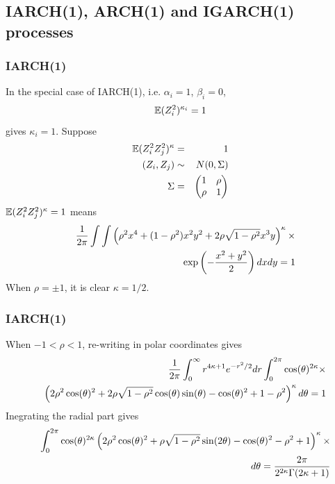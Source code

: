 \documentclass{beamer}
\begin{document}
\subsection{IARCH(1), ARCH(1) and IGARCH(1) processes}
\begin{frame}
  \frametitle{IARCH(1)}
  In the special case of IARCH(1), i.e. $\alpha_{i} = 1$, $\beta_{i} = 0$,
  \[
  \mathbb{E} (Z_i^2)^{\kappa_i} = 1
  \]
  gives $\kappa_i = 1$. Suppose
  \begin{eqnarray*}
    \mathbb{E} (Z_i^2 Z_j^2)^\kappa &=& 1 \\
    (Z_i, Z_j) &\sim& N(0, \Sigma) \\
    \Sigma &=&
    \begin{pmatrix}
      1 & \rho \\
      \rho & 1
    \end{pmatrix}
  \end{eqnarray*}
  $\mathbb{E} (Z_i^2 Z_j^2)^\kappa = 1$ means
  \begin{eqnarray*}
    && {1 \over 2\pi}
    \int \int
    \left(
      \rho^2 x^4 + (1 - \rho^2) x^2 y^2 + 2 \rho \sqrt{1 - \rho^2} x^3 y
    \right)^\kappa \times \\
    &&
    \exp\left(
      -{x^2 + y^2 \over 2}
    \right)
    dx dy = 1
  \end{eqnarray*}
  When $\rho = \pm 1$, it is clear $\kappa = 1/2$.  
\end{frame}

\begin{frame}
  \frametitle{IARCH(1)}
  When $-1 < \rho < 1$, re-writing in polar coordinates gives
  \begin{eqnarray*}
    && {1 \over 2\pi} \int_0^{\infty} r^{4\kappa + 1} e^{-r^2 / 2} dr
    \int_{0}^{2\pi} \cos(\theta)^{2 \kappa} \times \\
    &&
    \left(
      2 \rho^2 \cos(\theta)^2
      + 2 \rho \sqrt{1 - \rho^2} \cos(\theta) \sin(\theta) - \cos(\theta)^2 + 1 - \rho^2
    \right)^\kappa d\theta = 1
  \end{eqnarray*}
  Inegrating the radial part gives
  \begin{eqnarray*}
    && \int_{0}^{2\pi}
    \cos(\theta)^{2\kappa}
    \left(
      2 \rho^2 \cos(\theta)^2 + \rho \sqrt{1 - \rho^2} \sin(2\theta) - \cos(\theta)^2 - \rho^2 + 1
    \right)^\kappa \times \\
    && d\theta
    = {2 \pi
      \over
      2^{2 \kappa} \Gamma(2\kappa + 1)
    }
  \end{eqnarray*}
\end{frame}
\end{document}
